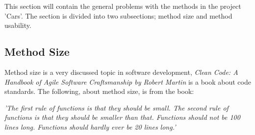 This section will contain the general problems with the methods in the project 'Cars'.
The section is divided into two subsections; method size and method usability.
\subsection{Method Size}
Method size is a very discussed topic in software development, \textit{Clean Code: A Handbook of Agile Software Craftsmanship by Robert Martin} is a book about code standards.
The following, about method size, is from the book:
\begin{center}
\textit{'The first rule of functions is that they should be small. The second rule of functions is that they should be smaller than that. Functions should not be 100 lines long. Functions should hardly ever be 20 lines long.'}
\end{center}
